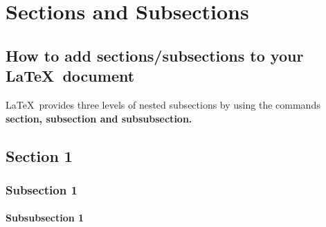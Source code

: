 

\chapter{Sections and Subsections}  

\section{How to add sections/subsections to your \LaTeX\ document}


\noindent \LaTeX\ provides three levels of nested subsections by using the commands \textbf{section, subsection and subsubsection.} %

\section{Section 1}
\noindent \lipsum[1][1] %

\subsection{Subsection 1}
\noindent \lipsum[1][1] %

\subsubsection{Subsubsection 1}
\noindent \lipsum[1][1] %


